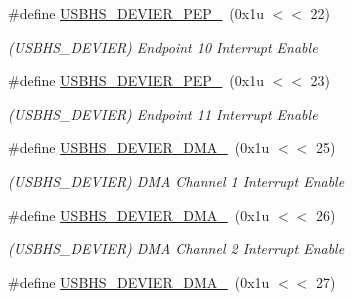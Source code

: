 \begin{DoxyCompactItemize}
\mbox{\label{group__SAMV71__USBHS_ga21412998dd56cc4408626fb2c98cadd8}} 
\#define \mbox{\hyperlink{group__SAMV71__USBHS_ga21412998dd56cc4408626fb2c98cadd8}{U\+S\+B\+H\+S\+\_\+\+D\+E\+V\+I\+E\+R\+\_\+\+P\+E\+P\+\_}}~(0x1u $<$$<$ 22)
\begin{DoxyCompactList}\small\item\em (U\+S\+B\+H\+S\+\_\+\+D\+E\+V\+I\+ER) Endpoint 10 Interrupt Enable \end{DoxyCompactList}\item 
\mbox{\label{group__SAMV71__USBHS_gaef695cfb4079c68f92a05817e9885dec}} 
\#define \mbox{\hyperlink{group__SAMV71__USBHS_gaef695cfb4079c68f92a05817e9885dec}{U\+S\+B\+H\+S\+\_\+\+D\+E\+V\+I\+E\+R\+\_\+\+P\+E\+P\+\_}}~(0x1u $<$$<$ 23)
\begin{DoxyCompactList}\small\item\em (U\+S\+B\+H\+S\+\_\+\+D\+E\+V\+I\+ER) Endpoint 11 Interrupt Enable \end{DoxyCompactList}\item 
\mbox{\label{group__SAMV71__USBHS_ga818377ea55b0df1a3425ecd4a75d93b3}} 
\#define \mbox{\hyperlink{group__SAMV71__USBHS_ga818377ea55b0df1a3425ecd4a75d93b3}{U\+S\+B\+H\+S\+\_\+\+D\+E\+V\+I\+E\+R\+\_\+\+D\+M\+A\+\_}}~(0x1u $<$$<$ 25)
\begin{DoxyCompactList}\small\item\em (U\+S\+B\+H\+S\+\_\+\+D\+E\+V\+I\+ER) D\+MA Channel 1 Interrupt Enable \end{DoxyCompactList}\item 
\mbox{\label{group__SAMV71__USBHS_ga77e6f737a9a0d19a659faebd731f5efe}} 
\#define \mbox{\hyperlink{group__SAMV71__USBHS_ga77e6f737a9a0d19a659faebd731f5efe}{U\+S\+B\+H\+S\+\_\+\+D\+E\+V\+I\+E\+R\+\_\+\+D\+M\+A\+\_}}~(0x1u $<$$<$ 26)
\begin{DoxyCompactList}\small\item\em (U\+S\+B\+H\+S\+\_\+\+D\+E\+V\+I\+ER) D\+MA Channel 2 Interrupt Enable \end{DoxyCompactList}\item 
\mbox{\label{group__SAMV71__USBHS_ga6022a0b8ecbc042bd7efd4d85460946a}} 
\#define \mbox{\hyperlink{group__SAMV71__USBHS_ga6022a0b8ecbc042bd7efd4d85460946a}{U\+S\+B\+H\+S\+\_\+\+D\+E\+V\+I\+E\+R\+\_\+\+D\+M\+A\+\_}}~(0x1u $<$$<$ 27)
$$
\end{DoxyCompactItemize}
